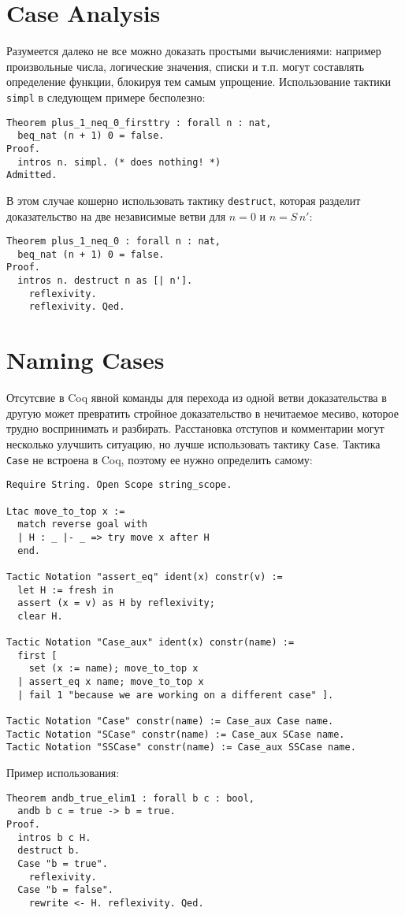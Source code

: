 \documentclass[12pt,a4paper,draft]{article}
\begin{document}
\section{Case Analysis}

Разумеется далеко не все можно доказать простыми вычислениями: например произвольные числа, логические значения, списки и т.п. могут составлять определение функции, блокируя тем самым упрощение. Использование тактики \texttt{simpl} в следующем примере бесполезно:

\begin{verbatim}
Theorem plus_1_neq_0_firsttry : forall n : nat,
  beq_nat (n + 1) 0 = false.
Proof.
  intros n. simpl. (* does nothing! *)
Admitted.
\end{verbatim}

В этом случае кошерно использовать тактику \texttt{destruct}, которая разделит доказательство на две независимые ветви для $n=0$ и $n = S \, n'$:

\begin{verbatim}
Theorem plus_1_neq_0 : forall n : nat,
  beq_nat (n + 1) 0 = false.
Proof.
  intros n. destruct n as [| n'].
    reflexivity.
    reflexivity. Qed.
\end{verbatim}


\section{Naming Cases}

Отсутсвие в Coq явной команды для перехода из одной ветви доказательства в другую может превратить стройное доказательство в нечитаемое месиво, которое трудно воспринимать и разбирать. Расстановка отступов и комментарии могут несколько улучшить ситуацию, но лучше использовать тактику \texttt{Case}. Тактика \texttt{Case} не встроена в Coq, поэтому ее нужно определить самому:

\begin{verbatim}
Require String. Open Scope string_scope.

Ltac move_to_top x :=
  match reverse goal with
  | H : _ |- _ => try move x after H
  end.

Tactic Notation "assert_eq" ident(x) constr(v) :=
  let H := fresh in
  assert (x = v) as H by reflexivity;
  clear H.

Tactic Notation "Case_aux" ident(x) constr(name) :=
  first [
    set (x := name); move_to_top x
  | assert_eq x name; move_to_top x
  | fail 1 "because we are working on a different case" ].

Tactic Notation "Case" constr(name) := Case_aux Case name.
Tactic Notation "SCase" constr(name) := Case_aux SCase name.
Tactic Notation "SSCase" constr(name) := Case_aux SSCase name.
\end{verbatim}

Пример использования:

\begin{verbatim}
Theorem andb_true_elim1 : forall b c : bool,
  andb b c = true -> b = true.
Proof.
  intros b c H.
  destruct b.
  Case "b = true".
    reflexivity.
  Case "b = false".
    rewrite <- H. reflexivity. Qed.
\end{verbatim}
\end{document}
